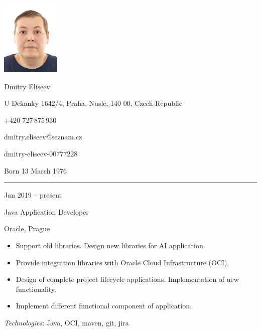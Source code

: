\documentclass[a4paper,10pt]{article}
\newlength{\cvcolumngapwidth}
\newlength{\cvleftcolumnwidth}
\newlength{\cvrightcolumnwidth}
\newcommand{\cvnamestyle}[1]{{\Large\cvnamefont\textcolor{cvnamecolor}{#1}}}
\newcommand{\cvsectionstyle}[1]{{\normalsize\cvsectionfont\textcolor{cvsectioncolor}{#1}}}
\newcommand{\cvtitlestyle}[1]{{\large\cvtitlefont\textcolor{cvtitlecolor}{#1}}}
\newcommand{\cvdurationstyle}[1]{{\small\cvdurationfont\textcolor{cvdurationcolor}{#1}}}
\newlength{\cvafteritemskipamount}
\newlength{\cvaftersectionskipamount}
\newlength{\cvafternameskipamount}
\newlength{\cvafterpersonalinfolineskipamount}
\newlength{\cvaftertitleskipamount}
\newlength{\cvparskip}
\newcommand{\cvpersonalinfo}[2]{
    \begin{minipage}[t]{\cvleftcolumnwidth}
        \vspace{0mm} %
        \raggedleft #1
    \end{minipage}%
    \hspace{\cvcolumngapwidth}%
    \begin{minipage}[t]{\cvrightcolumnwidth}
        \vspace{0mm} %
        #2
    \end{minipage}

    \vspace{\cvafteritemskipamount}
}
\newcommand{\cvname}[1]{
    \cvnamestyle{#1}

    \vspace{\cvafternameskipamount}
}
\newcommand{\cvpersonalinfolinewithicon}[3]{
    \raisebox{.5\fontcharht\font`E-.5\height}{\texttt{[image: \#2]}}
    #3

    \vspace{\cvafterpersonalinfolineskipamount}
}
\newcommand{\cvsection}[1]{
    \begin{minipage}[t]{\cvleftcolumnwidth}
        \raggedleft\cvsectionstyle{#1}
    \end{minipage}%
    \hspace{\cvcolumngapwidth}%
    \begin{minipage}[t]{\cvrightcolumnwidth}
        \textcolor{cvrulecolor}{\rule{\cvrightcolumnwidth}{0.3mm}}
    \end{minipage}

    \vspace{\cvaftersectionskipamount}
}
\newcommand{\cvitem}[2]{
    \begin{minipage}[t]{\cvleftcolumnwidth}
        \raggedleft #1
    \end{minipage}%
    \hspace{\cvcolumngapwidth}%
    \begin{minipage}[t]{\cvrightcolumnwidth}
        \setlength{\parskip}{\cvparskip} #2
    \end{minipage}

    \vspace{\cvafteritemskipamount}
}
\newcommand{\cvtitle}[1]{
    \cvtitlestyle{#1}

    \vspace{\cvaftertitleskipamount}
    \vspace{-\cvparskip}
}
\begin{document}

\cvpersonalinfo{
    \includegraphics[height=36mm]{../resources/photo.jpg}
}{
    \cvname{Dmitry Eliseev}

    \cvpersonalinfolinewithicon{height=4mm}{../resources/IcoMoon-Free-PDF/072-location.pdf}{
        U Dekanky 1642/4, Praha, Nusle, 140 00, Czech Republic
    }

    \cvpersonalinfolinewithicon{height=4mm}{../resources/IcoMoon-Free-PDF/067-phone.pdf}{
        +420 727\,875\,930
    }

    \cvpersonalinfolinewithicon{height=4mm}{../resources/IcoMoon-Free-PDF/070-envelop.pdf}{
        dmitry.eliseev@seznam.cz
    }

    \cvpersonalinfolinewithicon{height=4mm}{../resources/IcoMoon-Free-PDF/458-linkedin.pdf}{
        dmitry-eliseev-00777228
    }

    Born 13 March 1976
}



\cvsection{WORK EXPERIENCE}

\cvitem{
    \cvdurationstyle{Jan 2019 -- present}
}{
    \cvtitle{Java Application Developer}

    Oracle, Prague

    \begin{itemize}[leftmargin=*]
        \item Support old libraries. Design new libraries for AI application.
        \item Provide integration libraries with Oracle Cloud Infrastructure (OCI).
        \item Design of complete project lifecycle applications. Implementation of new functionality.
        \item Implement different functional component of application.
    \end{itemize}
    
    \textit{Technologies}: Java, OCI, maven, git, jira
}
\end{document}

